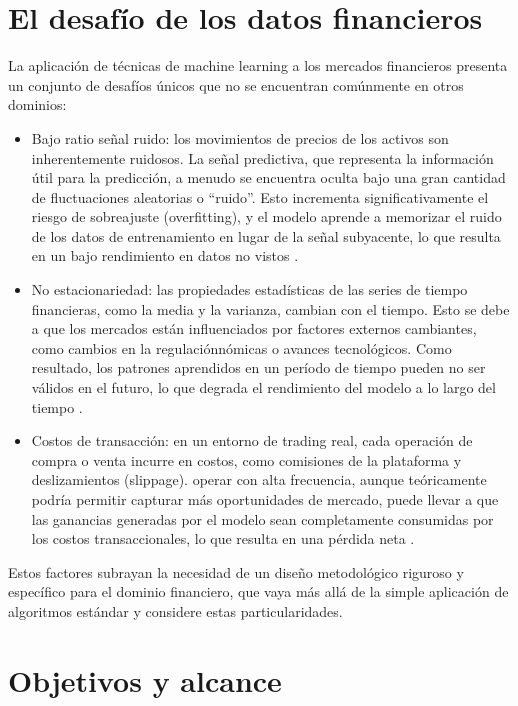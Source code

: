 \section{El desafío de los datos financieros}

La aplicación de técnicas de machine learning a los mercados financieros presenta un conjunto de desafíos únicos que no se encuentran comúnmente en otros dominios:

\begin{itemize}
    \item Bajo ratio señal ruido: los movimientos de precios de los activos son inherentemente ruidosos. La señal predictiva, que representa la información útil para la predicción, a menudo se encuentra oculta bajo una gran cantidad de fluctuaciones aleatorias o ``ruido''. Esto incrementa significativamente el riesgo de sobreajuste (overfitting), y el modelo aprende a memorizar el ruido de los datos de entrenamiento en lugar de la señal subyacente, lo que resulta en un bajo rendimiento en datos no vistos \cite{LoP:2018}.

    \item No estacionariedad: las propiedades estadísticas de las series de tiempo financieras, como la media y la varianza, cambian con el tiempo. Esto se debe a que los mercados están influenciados por factores externos cambiantes, como cambios en la regulaciónnómicas o avances tecnológicos. Como resultado, los patrones aprendidos en un período de tiempo pueden no ser válidos en el futuro, lo que degrada el rendimiento del modelo a lo largo del tiempo \cite{LoP:2018}.

    \item Costos de transacción: en un entorno de trading real, cada operación de compra o venta incurre en costos, como comisiones de la plataforma y deslizamientos (slippage). operar con alta frecuencia, aunque teóricamente podría permitir capturar más oportunidades de mercado, puede llevar a que las ganancias generadas por el modelo sean completamente consumidas por los costos transaccionales, lo que resulta en una pérdida neta \cite{LoP:2018}.
\end{itemize}

Estos factores subrayan la necesidad de un diseño metodológico riguroso y específico para el dominio financiero, que vaya más allá de la simple aplicación de algoritmos estándar y considere estas particularidades.

\section{Objetivos y alcance}

